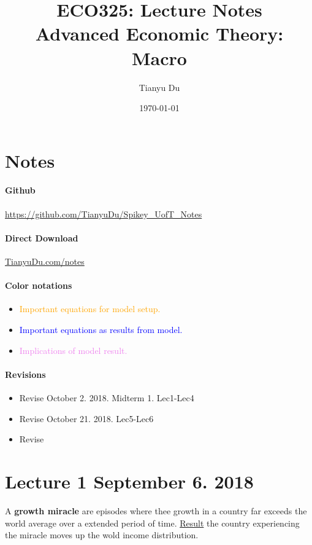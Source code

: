 \documentclass[]{article}
\title{ECO325: Lecture Notes \\ \small Advanced Economic Theory: Macro}
\author{Tianyu Du}
\date{\today}
\begin{document}
    \maketitle
    \doclicenseThis
    \section*{Notes}
    	\paragraph{Github} \url{https://github.com/TianyuDu/Spikey_UofT_Notes}
    	\paragraph{Direct Download} \url{TianyuDu.com/notes}
    	\paragraph{Color notations}
    		\begin{itemize}
    			\item \textcolor{orange}{Important equations for model setup.}
    			\item \textcolor{blue}{Important equations as results from model.}
    			\item \textcolor{violet}{Implications of model result.}
    		\end{itemize}
    \paragraph{Revisions}
    \begin{itemize}
    	\item Revise October 2. 2018. Midterm 1. Lec1-Lec4
    	\item Revise October 21. 2018. Lec5-Lec6
    	\item Revise 	
    \end{itemize}
    \tableofcontents
    \newpage
    
    \section{Lecture 1 September 6. 2018}
        \begin{definition}
            A \textbf{growth miracle} are episodes where thee growth in a country far exceeds the world average over a extended period of time. \ul{Result} the country experiencing the miracle moves up the wold income distribution.
        \end{definition}
        
\end{document}
